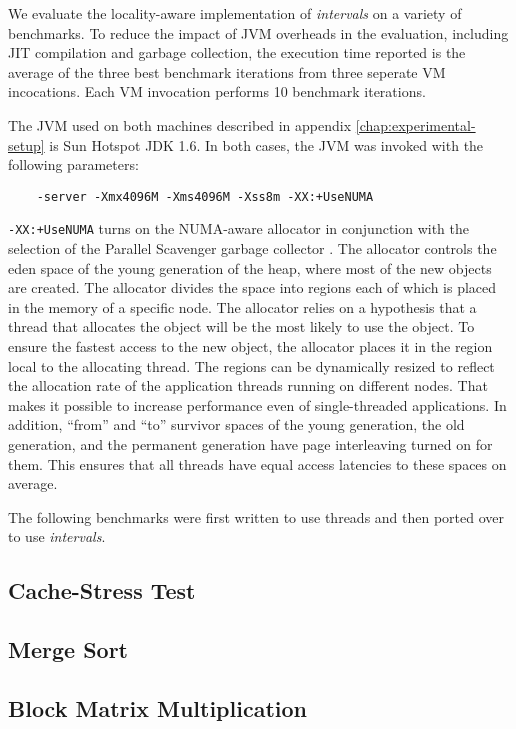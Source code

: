 We evaluate the locality-aware implementation of \emph{intervals} on a
variety of benchmarks. To reduce the impact of JVM overheads in the
evaluation, including JIT compilation and garbage collection, the
execution time reported is the average of the three best benchmark
iterations from three seperate VM incocations. Each VM invocation
performs 10 benchmark iterations.

The JVM used on both machines described in appendix
\ref{chap:experimental-setup} is Sun Hotspot JDK 1.6. In both cases,
the JVM was invoked with the following parameters:

\begin{verbatim}
    -server -Xmx4096M -Xms4096M -Xss8m -XX:+UseNUMA
\end{verbatim}

\verb!-XX:+UseNUMA! turns on the NUMA-aware allocator in conjunction
with the selection of the Parallel Scavenger garbage collector
\cite{Oracle2010, Humble2010}. The allocator controls the eden space
of the young generation of the heap, where most of the new objects are
created. The allocator divides the space into regions each of which is
placed in the memory of a specific node. The allocator relies on a
hypothesis that a thread that allocates the object will be the most
likely to use the object. To ensure the fastest access to the new
object, the allocator places it in the region local to the allocating
thread. The regions can be dynamically resized to reflect the
allocation rate of the application threads running on different
nodes. That makes it possible to increase performance even of
single-threaded applications. In addition, ``from'' and ``to''
survivor spaces of the young generation, the old generation, and the
permanent generation have page interleaving turned on for them. This
ensures that all threads have equal access latencies to these spaces
on average.

The following benchmarks were first written to use threads and then
ported over to use \emph{intervals}.

\subsection*{Cache-Stress Test}


\subsection*{Merge Sort}


\subsection*{Block Matrix Multiplication}



